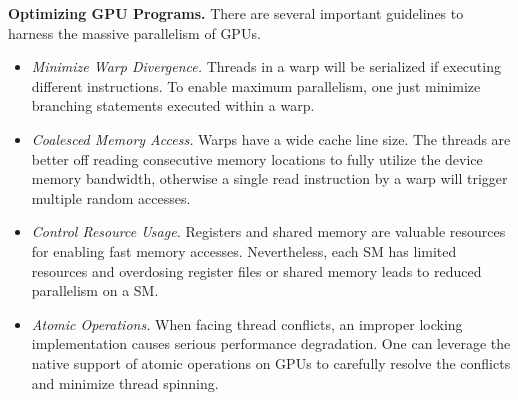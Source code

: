\vspace{1mm}\noindent\textbf{Optimizing GPU Programs.}
There are several important guidelines to harness the massive parallelism of GPUs.
\begin{itemize}
	\item \emph{Minimize Warp Divergence.} Threads in a warp will be serialized if executing different instructions. To enable maximum parallelism, one just minimize branching statements executed within a warp.  
	\item \emph{Coalesced Memory Access.} Warps have a wide cache line size. The threads are better off reading consecutive memory locations to fully utilize the device memory bandwidth, otherwise a single read instruction by a warp will trigger multiple random accesses. 
	\item \emph{Control Resource Usage.} Registers and shared memory are valuable resources for enabling fast memory accesses. Nevertheless, each SM has limited resources and overdosing register files or shared memory leads to reduced parallelism on a SM.  
	\item \emph{Atomic Operations.} When facing thread conflicts, an improper locking implementation causes serious performance degradation. One can leverage the native support of atomic operations \cite{sanders2010cuda} on GPUs to carefully resolve the conflicts and minimize thread spinning.
\end{itemize}